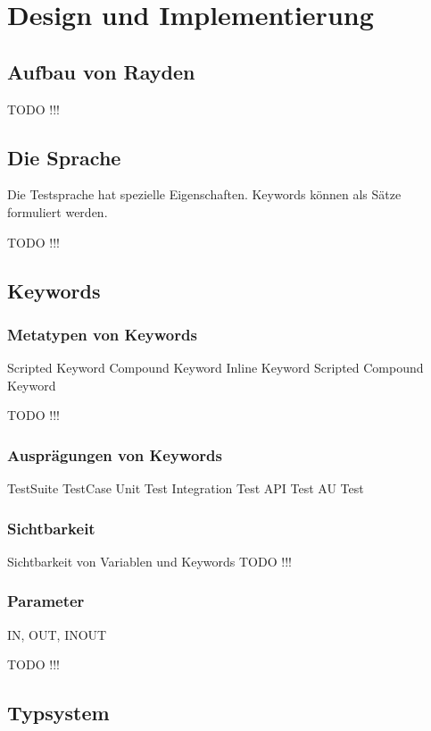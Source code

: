 ﻿\chapter{Design und Implementierung}
\label{cha:DesignUndImplementierung}

\section{Aufbau von Rayden}

TODO !!!

\section{Die Sprache}

Die Testsprache hat spezielle Eigenschaften. Keywords können als Sätze formuliert werden.

TODO !!!

\section{Keywords}


\subsection{Metatypen von Keywords}

Scripted Keyword
Compound Keyword
Inline Keyword 
Scripted Compound Keyword

TODO !!!

\subsection{Ausprägungen von Keywords}

TestSuite
TestCase
Unit Test
Integration Test
API Test
AU Test


\subsection{Sichtbarkeit}

Sichtbarkeit von Variablen und Keywords
TODO !!!

\subsection{Parameter}

IN, OUT, INOUT

TODO !!!

\section{Typsystem}

